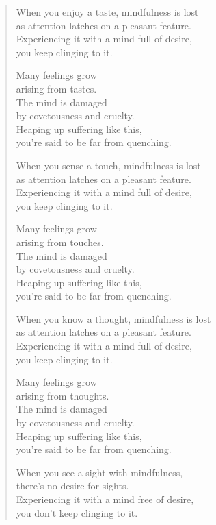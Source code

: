 \documentclass[12pt,openany]{book}%
\begin{document}
\begin{verse}
When you enjoy a taste, mindfulness is lost \\
as attention latches on a pleasant feature. \\
Experiencing it with a mind full of desire, \\
you keep clinging to it. 

Many feelings grow \\
arising from tastes. \\
The mind is damaged \\
by covetousness and cruelty. \\
Heaping up suffering like this, \\
you’re said to be far from quenching. 

When you sense a touch, mindfulness is lost \\
as attention latches on a pleasant feature. \\
Experiencing it with a mind full of desire, \\
you keep clinging to it. 

Many feelings grow \\
arising from touches. \\
The mind is damaged \\
by covetousness and cruelty. \\
Heaping up suffering like this, \\
you’re said to be far from quenching. 

When you know a thought, mindfulness is lost \\
as attention latches on a pleasant feature. \\
Experiencing it with a mind full of desire, \\
you keep clinging to it. 

Many feelings grow \\
arising from thoughts. \\
The mind is damaged \\
by covetousness and cruelty. \\
Heaping up suffering like this, \\
you’re said to be far from quenching. 

When you see a sight with mindfulness, \\
there’s no desire for sights. \\
Experiencing it with a mind free of desire, \\
you don’t keep clinging to it. 


\end{verse}
\end{document}
